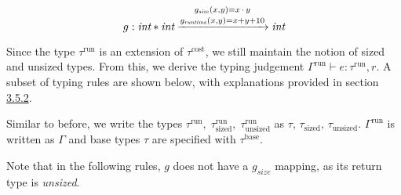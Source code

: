 \[ g : \textit{int} * \textit{int} \xrightarrow{\stackanchor[1mm]{\(\scriptstyle g_{\textit{size}}(x, y) = x \, \cdot \, y \)}{\(\scriptstyle g_{\textit{runtime}}(x, y) = x + y + 10 \)}} \textit{int} \]

Since the type \( \tau^\textrm{run} \) is an extension of \( \tau^\textrm{cost} \), we still maintain the notion of sized and unsized types. From this, we derive the typing judgement \( \Gamma^\textrm{run} \vdash e : \tau^\textrm{run}, r \). A subset of typing rules are shown below, with explanations provided in section \hyperref[sec:3.5.2]{3.5.2}.

Similar to before, we write the types \( \tau^\textrm{run}, \; \tau^\textrm{run}_\textrm{sized}, \; \tau^\textrm{run}_\textrm{unsized} \) as \( \tau, \, \tau_\textrm{sized}, \,\tau_\textrm{unsized} \). \( \Gamma^\textrm{run} \) is written as \( \Gamma \) and base types \( \tau \) are specified with \( \tau^\textrm{base} \).

\vspace{1mm}

\begin{prooftree}
\end{prooftree}

\begin{prooftree}
\end{prooftree}

\begin{prooftree}
\end{prooftree}

\vspace{2mm}

Note that in the following rules, \( g \) does not have a \( g_\textit{size} \) mapping, as its return type is \textit{unsized}.

